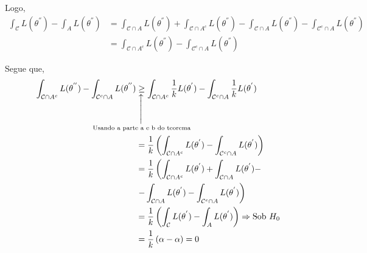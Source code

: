 \documentclass[12pt]{beamer}
\begin{document}
\begin{frame}{}
\begin{block}{}
\justifying
Logo,
{\footnotesize
\begin{align*}
\int_{\mathcal{C}}L(\theta^{''})-\int_{A}L(\theta^{''})&= \int_{\mathcal{C}\cap A}L(\theta^{''}) + \int_{\mathcal{C}\cap A^{c}}L(\theta^{''}) - \int_{\mathcal{C}\cap A}L(\theta^{''})-\int_{\mathcal{C}^{c}\cap A}L(\theta^{''})\\
&= \int_{\mathcal{C}\cap A^{c}}L(\theta^{''}) - \int_{\mathcal{C}^{c}\cap A}L(\theta^{''})
\end{align*}
}
\end{block}
\end{frame}

\begin{frame}{}
\begin{block}{}
\justifying
Segue que,
{\footnotesize
\begin{align*}
\int_{\mathcal{C}\cap A^{c}}L(\theta^{''}) -\int_{\mathcal{C}^{c}\cap A}L(\theta^{''})&\SetaUP{\text{Usando a parte a e b do teorema}}{\geq} \int_{\mathcal{C}\cap A^{c}}\dfrac{1}{k}L(\theta^{'})-\int_{\mathcal{C}^{c}\cap A}\dfrac{1}{k}L(\theta^{'})\\
&=\dfrac{1}{k}\left(\int_{\mathcal{C}\cap A^{c}}L(\theta^{'})-\int_{\mathcal{C}^{c}\cap A}L(\theta^{'})\right)\\
&=\dfrac{1}{k}\left(\int_{\mathcal{C}\cap A^{c}}L(\theta^{'})+\int_{\mathcal{C}\cap A}L(\theta^{'}) - \right.\\
&\left.-\int_{\mathcal{C}\cap A}L(\theta^{'})-\int_{\mathcal{C}^{c}\cap A}L(\theta^{'})\right)\\
&=\dfrac{1}{k}\left(\int_{\mathcal{C}}L(\theta^{'})-\int_{A}L(\theta^{'})\right)\Rightarrow \text{Sob}~H_{0}\\
&=\dfrac{1}{k}\left(\alpha-\alpha\right)=0
\end{align*}
}
\end{block}
\end{frame}

\end{document}
